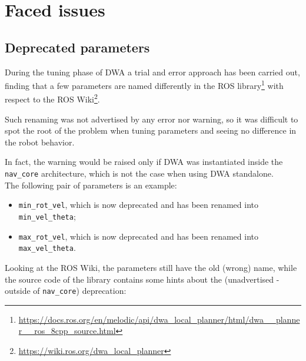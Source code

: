 \documentclass[11pt,a4paper]{article}
\begin{document}

\section{Faced issues}



\subsection{Deprecated parameters}

During the tuning phase of DWA a trial and error approach has been carried out, finding that
a few parameters are named differently in the ROS library\footnote
{\href{https://docs.ros.org/en/melodic/api/dwa\_local\_planner/html/dwa\_\_planner\_\_ros\_8cpp\_source.html}
{https://docs.ros.org/en/melodic/api/dwa\_local\_planner/html/dwa\_\_planner\_\_ros\_8cpp\_source.html}}
with respect to the ROS Wiki\footnote
{\href{https://wiki.ros.org/dwa\_local\_planner}{https://wiki.ros.org/dwa\_local\_planner}}.

Such renaming was not advertised by any error nor warning, so it was difficult to spot the root of the problem
when tuning parameters and seeing no difference in the robot behavior.

In fact, the warning would be raised only if DWA was instantiated inside the \texttt{nav\_core} architecture,
which is not the case when using DWA standalone.\\

The following pair of parameters is an example:
\begin{itemize}
    \item \texttt{min\_rot\_vel}, which is now deprecated and has been renamed into \texttt{min\_vel\_theta};
    \item \texttt{max\_rot\_vel}, which is now deprecated and has been renamed into \texttt{max\_vel\_theta}.\\
\end{itemize}

Looking at the ROS Wiki, the parameters still have the old (wrong) name, while the source code of the library
contains some hints about the (unadvertised - outside of \texttt{nav\_core}) deprecation:
\end{document}
